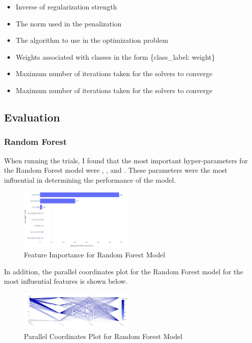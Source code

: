 \documentclass{article}
\begin{document}
\begin{itemize}
  \item {} Inverse of regularization strength
  \item {} The norm used in the penalization
  \item {} The algorithm to use in the optimization problem
  \item {} Weights associated with classes in the form \{class\_label: weight\}
  \item {} Maximum number of iterations taken for the solvers to converge
  \item {} Maximum number of iterations taken for the solvers to converge
\end{itemize}

\subsection{Evaluation}



\subsubsection{Random Forest}
When running the trials, I found that the most important hyper-parameters for the Random Forest model were , , and . These parameters were the most influential in determining the performance of the model. 

\begin{figure}[H]
  \centering
  \includegraphics[width=0.5\textwidth]{img/random_forest_importance.png}
  \caption{Feature Importance for Random Forest Model}
\end{figure}

\noindent In addition, the parallel coordinates plot for the Random Forest model for the most influential features is shown below.

\begin{figure}[H]
  \centering
  \includegraphics[width=0.5\textwidth]{img/tmp.png}
  \caption{Parallel Coordinates Plot for Random Forest Model}
\end{figure}
\end{document}
